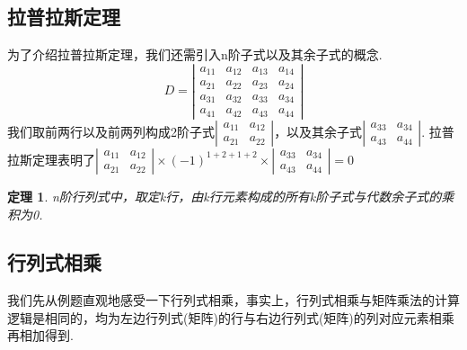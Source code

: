 \documentclass[12pt, a4paper, oneside]{ctexbook}
\newtheorem{theorem}{定理}[section]
\begin{document}
\subsection{拉普拉斯定理}
为了介绍拉普拉斯定理，我们还需引入n阶子式以及其余子式的概念. 
$$D=\left | \begin{matrix}
    a_{11}   & a_{12}   & a_{13} & a_{14} \\
    a_{21}   & a_{22}   & a_{23} & a_{24} \\
    a_{31}   & a_{32}   & a_{33} & a_{34} \\
    a_{41}   & a_{42}   & a_{43} & a_{44}
\end{matrix} \right |$$
我们取前两行以及前两列构成2阶子式$\left | \begin{matrix}
    a_{11} & a_{12} \\
    a_{21} & a_{22}
\end{matrix} \right |$，以及其余子式$\left | \begin{matrix}
    a_{33} & a_{34} \\
    a_{43} & a_{44}
\end{matrix} \right |$.
拉普拉斯定理表明了$\left | \begin{matrix}
    a_{11} & a_{12} \\
    a_{21} & a_{22}
\end{matrix} \right | \times (-1)^{1 + 2 + 1 + 2} \times \left | \begin{matrix}
    a_{33} & a_{34} \\
    a_{43} & a_{44}
\end{matrix} \right | = 0$

\begin{theorem}
    n阶行列式中，取定k行，由k行元素构成的所有k阶子式与代数余子式的乘积为0. 
\end{theorem}

\subsection{行列式相乘}

我们先从例题直观地感受一下行列式相乘，事实上，行列式相乘与矩阵乘法的计算逻辑是相同的，均为左边行列式(矩阵)的行与右边行列式(矩阵)的列对应元素相乘再相加得到. 
\end{document}
